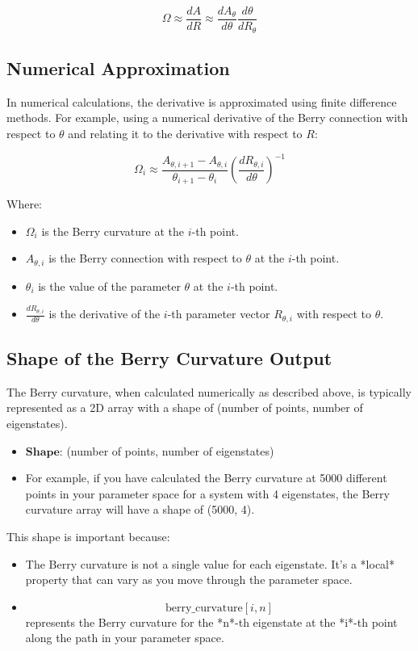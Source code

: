 \documentclass{article}
\begin{document}
$$
\Omega \approx \frac{dA}{dR} \approx \frac{dA_\theta}{d\theta} \frac{d\theta}{dR_\theta}
$$

\subsection{Numerical Approximation}

In numerical calculations, the derivative is approximated using finite difference methods. For example, using a numerical derivative of the Berry connection with respect to $\theta$ and relating it to the derivative with respect to $R$:

$$
\Omega_i \approx \frac{A_{\theta, i+1} - A_{\theta, i}}{\theta_{i+1} - \theta_i} \left( \frac{dR_{\theta, i}}{d\theta} \right)^{-1}
$$

Where:
\begin{itemize}
\item $\Omega_i$ is the Berry curvature at the $i$-th point.
\item $A_{\theta, i}$ is the Berry connection with respect to $\theta$ at the $i$-th point.
\item $\theta_i$ is the value of the parameter $\theta$ at the $i$-th point.
\item $\frac{dR_{\theta, i}}{d\theta}$ is the derivative of the $i$-th parameter vector $R_{\theta, i}$ with respect to $\theta$.
\end{itemize}

\subsection{Shape of the Berry Curvature Output}

The Berry curvature, when calculated numerically as described above, is typically represented as a 2D array with a shape of (number of points, number of eigenstates).

\begin{itemize}
\item $\textbf{Shape:}$ (number of points, number of eigenstates)
\item For example, if you have calculated the Berry curvature at 5000 different points in your parameter space for a system with 4 eigenstates, the Berry curvature array will have a shape of (5000, 4).
\end{itemize}

This shape is important because:

\begin{itemize}
\item The Berry curvature is not a single value for each eigenstate. It's a *local* property that can vary as you move through the parameter space.
\item $$\text{berry\_curvature}[i, n]$$ represents the Berry curvature for the *n*-th eigenstate at the *i*-th point along the path in your parameter space.
\end{itemize}
\end{document}
